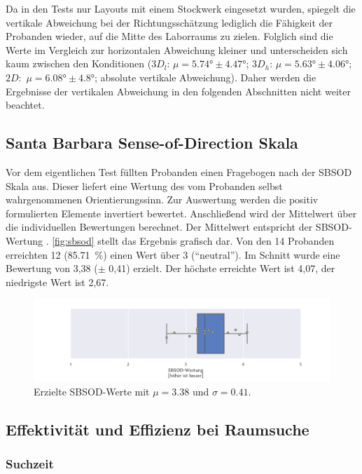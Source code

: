 Da in den Tests nur Layouts mit einem Stockwerk eingesetzt wurden, spiegelt die vertikale Abweichung bei der Richtungsschätzung lediglich die Fähigkeit der Probanden wieder, auf die Mitte des Laborraums zu zielen.
Folglich sind die Werte im Vergleich zur horizontalen Abweichung kleiner und unterscheiden sich kaum zwischen den Konditionen ($3D_l$: $\mu = \ang{5,74} \pm \ang{4,47}$; $3D_h$: $\mu = \ang{5,63} \pm \ang{4,06}$; $2D:$ $\mu = \ang{6,08} \pm \ang{4,8}$; absolute vertikale Abweichung).
Daher werden die Ergebnisse der vertikalen Abweichung in den folgenden Abschnitten nicht weiter beachtet.

\subsection{Santa Barbara Sense-of-Direction Skala}
Vor dem eigentlichen Test füllten Probanden einen Fragebogen nach der SBSOD Skala aus.
Dieser liefert eine Wertung des vom Probanden selbst wahrgenommenen Orientierungssinn.
Zur Auswertung werden die positiv formulierten Elemente invertiert bewertet.
Anschließend wird der Mittelwert über die individuellen Bewertungen berechnet.
Der Mittelwert entspricht der SBSOD-Wertung \parencite{Hegarty2002}.
\autoref{fig:sbsod} stellt das Ergebnis grafisch dar.
Von den 14 Probanden erreichten 12 (\SI{85,71}{\percent}) einen Wert über 3 (\enquote{neutral}).
Im Schnitt wurde eine Bewertung von 3,38 ($\pm$ 0,41) erzielt.
Der höchste erreichte Wert ist 4,07, der niedrigste Wert ist 2,67.
\begin{figure}[h]
    \centering
    \includegraphics[trim={3cm, 0, 2.5cm, 0}, clip, width=\linewidth]{figures/analysis/sbsod}
    \caption{Erzielte SBSOD-Werte mit $\mu = \num{3,38}$ und $\sigma = \num{0,41}$.}
    \label{fig:sbsod}
\end{figure}

\subsection{Effektivität und Effizienz bei Raumsuche}
\subsubsection*{Suchzeit}
\label{ssec:searchtime}

